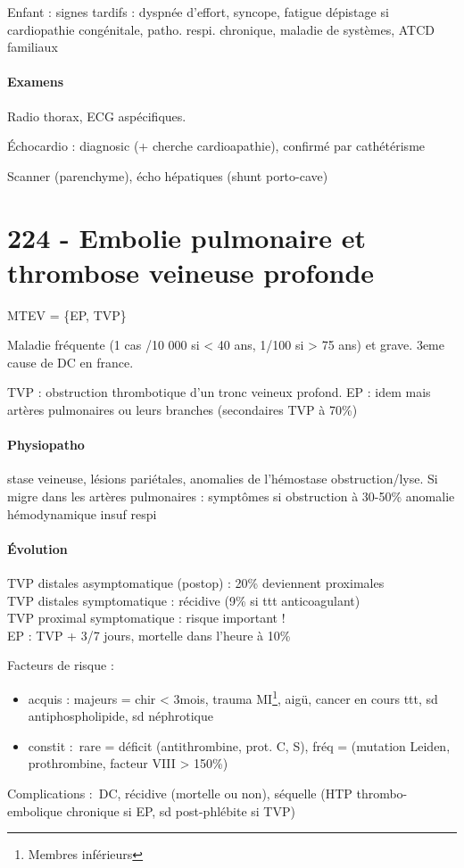 Enfant : signes tardifs : dyspnée d'effort, syncope, fatigue
\thus dépistage si cardiopathie congénitale, patho. respi. chronique, maladie de
systèmes, ATCD familiaux

\paragraph{Examens}
Radio thorax, ECG aspécifiques.

Échocardio : diagnosic (+ cherche cardioapathie), confirmé par cathétérisme 

Scanner (parenchyme), écho hépatiques (shunt porto-cave)



\section{224 - Embolie pulmonaire et thrombose veineuse profonde}%
\label{sec:224_embolie_pulmonaire_et_thrombose_veineuse_profonde}
\gls{MTEV} = \{\gls{EP}, \gls{TVP}\}

Maladie fréquente (1 cas /10 000 si < 40 ans, 1/100 si > 75 ans) et grave.
3eme cause de DC en france.

TVP : obstruction thrombotique d'un tronc veineux profond. EP : idem mais
artères pulmonaires ou leurs branches (secondaires TVP à 70\%)

\paragraph{Physiopatho} stase veineuse, lésions pariétales, anomalies de l'hémostase \thus
obstruction/lyse. Si migre dans les artères pulmonaires : symptômes si
obstruction à 30-50\% \thus anomalie hémodynamique \thus insuf respi

\paragraph{Évolution}
TVP distales asymptomatique (postop) : 20\% deviennent proximales\\
TVP distales symptomatique : récidive (9\% si ttt anticoagulant)\\
TVP proximal symptomatique : risque important !\\
EP : TVP + 3/7 jours, mortelle dans l'heure à 10\%

Facteurs de risque :
\begin{itemize}
\item acquis : majeurs = chir < 3mois, trauma MI\footnote{Membres inférieurs},
  \faHospitalO{} aigü, cancer en cours  ttt, sd antiphospholipide, sd
  néphrotique
\item constit : rare = déficit (antithrombine, prot. C, S), fréq = (mutation {Leiden,
    prothrombine}, facteur VIII > 150\%)
\end{itemize}
Complications : DC, récidive (mortelle ou non), séquelle (HTP thrombo-embolique
chronique si EP, sd post-phlébite si TVP)

